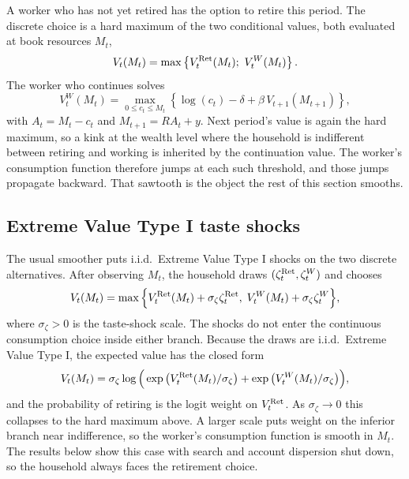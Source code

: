 A worker who has not yet retired has the option to retire this period. The discrete choice
is a hard maximum of the two conditional values, both evaluated at book resources $M_t$,
\begin{equation}
V_t(M_t) = \max \left\{ V_t^{\Ret}(M_t);\ V_t^{W}(M_t) \right\}.
\end{equation}
The worker who continues solves
\begin{equation}
V_t^{W}(M_t) = \max_{0 \le c_t \le M_t}
\left\{ \log(c_t) - \delta + \beta\, V_{t+1}(M_{t+1}) \right\},
\end{equation}
with $A_t = M_t - c_t$ and $M_{t+1} = R A_t + y$. Next period's value is again the hard
maximum, so a kink at the wealth level where the household is indifferent between
retiring and working is inherited by the continuation value. The worker's consumption
function therefore jumps at each such threshold, and those jumps propagate backward.
That sawtooth is the object the rest of this section smooths.

\subsection{Extreme Value Type I taste shocks}
The usual smoother puts i.i.d.\ Extreme Value Type I shocks on the two discrete
alternatives. After observing $M_t$, the household draws $(\zeta_t^{\mathrm{Ret}}, \zeta_t^{W})$ and
chooses
\begin{equation}
V_t(M_t) = \max \Big\{
V_t^{\mathrm{Ret}}(M_t) + \sigma_\zeta \zeta_t^{\mathrm{Ret}},\;
V_t^{W}(M_t) + \sigma_\zeta \zeta_t^{W}
\Big\},
\end{equation}
where $\sigma_\zeta > 0$ is the taste-shock scale. The shocks do not enter the continuous
consumption choice inside either branch. Because the draws are i.i.d.\ Extreme Value
Type I, the expected value has the closed form
\begin{equation}
V_t(M_t) = \sigma_\zeta \log \Big(
\exp\big(V_t^{\mathrm{Ret}}(M_t)/\sigma_\zeta\big)
+ \exp\big(V_t^{W}(M_t)/\sigma_\zeta\big)
\Big),
\end{equation}
and the probability of retiring is the logit weight on $V_t^{\mathrm{Ret}}$. As $\sigma_\zeta \to 0$ this
collapses to the hard maximum above. A larger scale puts weight on the inferior branch
near indifference, so the worker's consumption function is smooth in $M_t$. The results
below show this case with search and account dispersion shut down, so the household
always faces the retirement choice.

